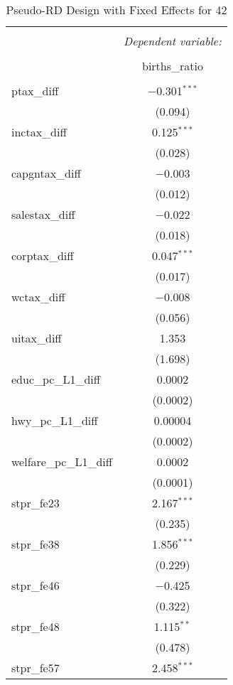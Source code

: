 
\begin{table}[!htbp] \centering 
  \caption{Pseudo-RD Design with Fixed Effects for  42} 
  \label{} 
\begin{tabular}{@{\extracolsep{5pt}}lc} 
\\[-1.8ex]\hline 
\hline \\[-1.8ex] 
 & \multicolumn{1}{c}{\textit{Dependent variable:}} \\ 
\cline{2-2} 
\\[-1.8ex] & births\_ratio \\ 
\hline \\[-1.8ex] 
 ptax\_diff & $-$0.301$^{***}$ \\ 
  & (0.094) \\ 
  inctax\_diff & 0.125$^{***}$ \\ 
  & (0.028) \\ 
  capgntax\_diff & $-$0.003 \\ 
  & (0.012) \\ 
  salestax\_diff & $-$0.022 \\ 
  & (0.018) \\ 
  corptax\_diff & 0.047$^{***}$ \\ 
  & (0.017) \\ 
  wctax\_diff & $-$0.008 \\ 
  & (0.056) \\ 
  uitax\_diff & 1.353 \\ 
  & (1.698) \\ 
  educ\_pc\_L1\_diff & 0.0002 \\ 
  & (0.0002) \\ 
  hwy\_pc\_L1\_diff & 0.00004 \\ 
  & (0.0002) \\ 
  welfare\_pc\_L1\_diff & 0.0002 \\ 
  & (0.0001) \\ 
  stpr\_fe23 & 2.167$^{***}$ \\ 
  & (0.235) \\ 
  stpr\_fe38 & 1.856$^{***}$ \\ 
  & (0.229) \\ 
  stpr\_fe46 & $-$0.425 \\ 
  & (0.322) \\ 
  stpr\_fe48 & 1.115$^{**}$ \\ 
  & (0.478) \\ 
  stpr\_fe57 & 2.458$^{***}$ \\ 

\end{tabular}
\end{table}
